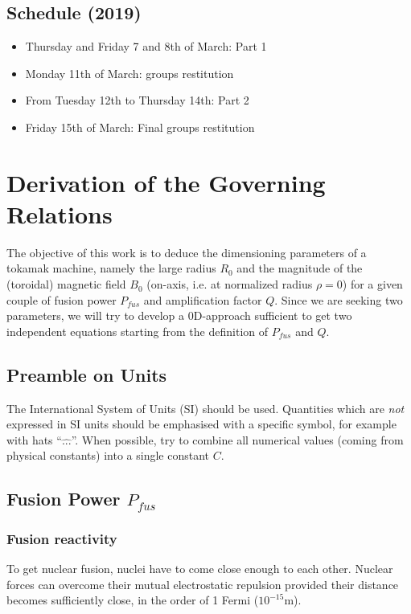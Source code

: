 \subsection{Schedule (2019)}
\begin{itemize}
\item Thursday and Friday 7 and 8th of March: Part 1
\item Monday 11th of March: groups restitution
\item From Tuesday 12th to Thursday 14th: Part 2
\item Friday 15th of March: Final groups restitution
\end{itemize}

\section{Derivation of the Governing Relations}
The objective of this work is to deduce the dimensioning parameters of a tokamak machine, namely the large radius $R_0$ and the magnitude of the (toroidal) magnetic field $B_0$ (on-axis, i.e. at normalized radius $\rho=0$) for a given couple of fusion power $P_{fus}$ and amplification factor $Q$. Since we are seeking two parameters, we will try to develop a 0D-approach sufficient to get two independent equations starting from the definition of $P_{fus}$ and $Q$. 

\subsection{Preamble on Units}
The International System of Units (SI) should be used. Quantities which are \emph{not} expressed in SI units should be emphasised with a specific symbol, for example with hats ``$\hat{...}$''. When possible, try to combine all numerical values (coming from physical constants) into a single constant $C$.

\subsection{Fusion Power $P_{fus}$}
\subsubsection{Fusion reactivity}
To get nuclear fusion, nuclei have to come close enough to each other. Nuclear forces can overcome their mutual electrostatic repulsion provided their distance becomes sufficiently close, in the order of 1 Fermi ($10^{-15}$m). %

